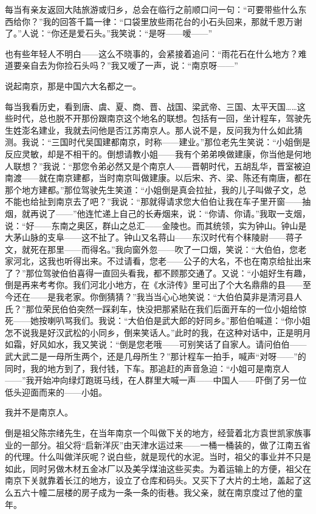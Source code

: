 \par 每当有亲友返回大陆旅游或归乡，总会在临行之前顺口问一句：“可要带些什么东西给你？”我的回答千篇一律：“口袋里放些雨花台的小石头回来，那就千恩万谢了。”人说：“你还是爱石头。”我笑说：“是呀——嗳——”
\par 也有些年轻人不明白——这么不晓事的，会紧接着追问：“雨花石在什么地方？难道要亲自去为你捡石头吗？”我又嗳了一声，说：“南京呀——”
\par 说起南京，那是中国六大名都之一。
\par 每当我看历史，看到唐、虞、夏、商、晋、战国、梁武帝、三国、太平天国……这些时代，总也脱不开那份跟南京这个地名的联想。包括有一回，坐计程车，驾驶先生姓澎名建业，我就去问他是否江苏南京人。那人说不是，反问我为什么如此猜测。我说：“三国时代吴国建都南京，时称——建业。”那位老先生笑说：“小姐倒是反应灵敏，却是不相干的。倒想请教小姐——我有个弟弟唤做建康，你当他是何地人联想？”我说：“那您令弟必然又是个南京人——晋朝时代，五胡乱华，晋室被迫南渡——就在南京建都，当时南京叫做建康。以后宋、齐、梁、陈还有南唐，都在那个地方建都。”那位驾驶先生笑道：“小姐倒是真会拉扯，我的儿子叫做子文，总不能也给扯到南京去了吧？”我说：“那就得请求您大伯伯让我在车子里开窗——抽烟，就再说了——”他连忙递上自己的长寿烟来，说：“你请、你请。”我取一支烟，说：“好——东南之奥区，群山之总汇——金陵也。而其统领，实为钟山。钟山是大茅山脉的支阜——这不扯了。钟山又名蒋山——东汉时代有个秣陵尉——蒋子文，就死在那里——而得名。”我向窗外忽——吹了一口烟，笑说：“大伯伯，您老家河北，这我也听得出来。不过请看，您老——公子的大名，不也在南京给扯出来了？”那位驾驶伯伯喜得一直回头看我，都不顾那交通了。又说：“小姐好生有趣，倒是再来考考你。我们河北小地方，在《水浒传》里可出了个大名鼎鼎的县——至今还在——是我老家。你倒猜猜？”我当当心心地笑说：“大伯伯莫非是清河县人氏？”那位荣民伯伯突然一踩刹车，快没把那紧贴在我们后面开车的一位小姐给惊死——她按喇叭骂我们。我说：“大伯伯是武大郎的好同乡。”那伯伯喊道：“你小姐怎不说我是好汉武松的小同乡，倒来笑话人。”此时的我，在这种对话中，正是明月如霜，好风如水，我又笑说：“倒是您老哦——可别笑话了自家人。请问伯伯——武大武二是一母所生两个，还是几母所生？”那计程车一拍手，喊声“对呀——”的同时，我的地方到了，我付钱，下车。那追赶的声音急迫：“小姐可是南京人——”我开始冲向绿灯跑斑马线，在人群里大喊一声——中国人——吓倒了另一位低头迎面而来的——小姐。
\par 我并不是南京人。
\par 倒是祖父陈宗绪先生，在当年南京一个叫做下关的地方，经营着北方袁世凯家族事业的一部分。祖父将“启新洋灰”由天津水运过来——一桶一桶装的，做了江南五省的代理。什么叫做洋灰呢？说白些，就是现代的水泥。当时，祖父的事业并不只是如此，同时另做木材五金冰厂以及美孚煤油这些买卖。为着运输上的方便，祖父在南京下关就靠着长江的地方，设立了仓库和码头。又买下了大片的土地，盖起了这么五六十幢二层楼的房子成为一条一条的街巷。我父亲，就在南京度过了他的童年。
